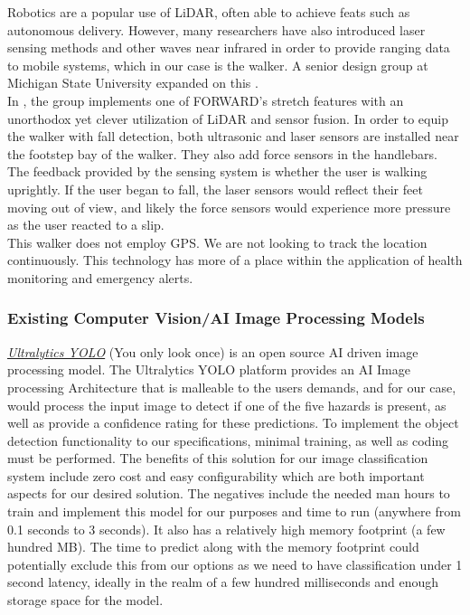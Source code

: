 \noindent Robotics are a popular use of LiDAR, often able to achieve feats such as autonomous delivery. However, many researchers have also introduced laser sensing methods and other waves near infrared in order to provide ranging data to mobile systems, which in our case is the walker. A senior design group at Michigan State University expanded on this \cite{mstate}.\\

\noindent In \cite{FallDetect}, the group implements one of FORWARD's stretch features with an unorthodox yet clever utilization of LiDAR and sensor fusion. In order to equip the walker with fall detection, both ultrasonic and laser sensors are installed near the footstep bay of the walker. They also add force sensors in the handlebars. The feedback provided by the sensing system is whether the user is walking uprightly. If the user began to fall, the laser sensors would reflect their feet moving out of view, and likely the force sensors would experience more pressure as the user reacted to a slip. \\

\noindent This walker does not employ GPS. We are not looking to track the location continuously. This technology has more of a place within the application of health monitoring and emergency alerts.\\


\subsubsection{Existing Computer Vision/AI Image Processing Models}
 \underline{\textit{Ultralytics YOLO}} (You only look once) is an open source AI driven image processing model. The Ultralytics YOLO platform provides an AI Image processing Architecture that is malleable to the users demands, and for our case, would process the input image to detect if one of the five hazards is present, as well as provide a confidence rating for these predictions. To implement the object detection functionality to our specifications, minimal training, as well as coding must be performed. The benefits of this solution for our image classification system include zero cost and easy configurability which are both important aspects for our desired solution. The negatives include the needed man hours to train and implement this model for our purposes and time to run (anywhere from 0.1 seconds to 3 seconds). It also has a relatively high memory footprint (a few hundred MB). The time to predict along with the memory footprint could potentially exclude this from our options as we need to have classification under 1 second latency, ideally in the realm of a few hundred milliseconds and enough storage space for the model. \\

